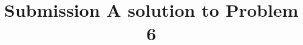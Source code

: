 \documentclass[12pt]{article}
\begin{document}
\title{Submission A solution to Problem 6}
\date{}
\maketitle
\end{document}
